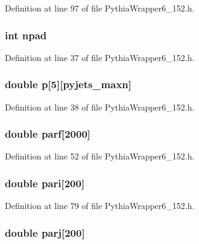 Definition at line 97 of file Pythia\-Wrapper6\_\-152.h.
\subsubsection{\setlength{\rightskip}{0pt plus 5cm}int {\bf npad}}\label{PythiaWrapper6__152_8h_ad92761fbbdc26c9f4a19000b8a472c6}




Definition at line 37 of file Pythia\-Wrapper6\_\-152.h.
\subsubsection{\setlength{\rightskip}{0pt plus 5cm}double {\bf p}[5][{\bf pyjets\_\-maxn}]}\label{PythiaWrapper6__152_8h_d391ea88e52cee16ef732a00ea497d5a}




Definition at line 38 of file Pythia\-Wrapper6\_\-152.h.
\subsubsection{\setlength{\rightskip}{0pt plus 5cm}double {\bf parf}[2000]}\label{PythiaWrapper6__152_8h_2187293022d9c4ab4081e477ac6633bb}




Definition at line 52 of file Pythia\-Wrapper6\_\-152.h.
\subsubsection{\setlength{\rightskip}{0pt plus 5cm}double {\bf pari}[200]}\label{PythiaWrapper6__152_8h_bf6f48d977c7b10946e7c7e29702ce4e}




Definition at line 79 of file Pythia\-Wrapper6\_\-152.h.
\subsubsection{\setlength{\rightskip}{0pt plus 5cm}double {\bf parj}[200]}\label{PythiaWrapper6__152_8h_1f9cefc664796e0eabcddf6ffcb11da3}





